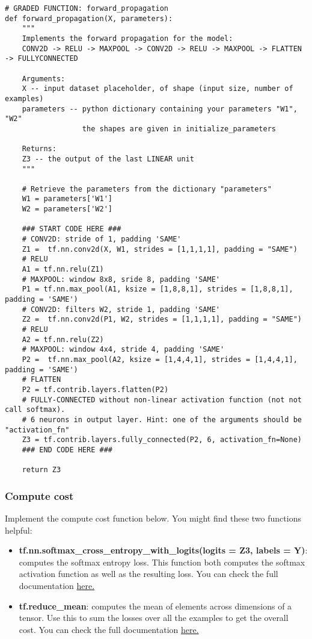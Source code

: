     
\begin{verbatim}
# GRADED FUNCTION: forward_propagation
def forward_propagation(X, parameters):
    """
    Implements the forward propagation for the model:
    CONV2D -> RELU -> MAXPOOL -> CONV2D -> RELU -> MAXPOOL -> FLATTEN -> FULLYCONNECTED
    
    Arguments:
    X -- input dataset placeholder, of shape (input size, number of examples)
    parameters -- python dictionary containing your parameters "W1", "W2"
                  the shapes are given in initialize_parameters

    Returns:
    Z3 -- the output of the last LINEAR unit
    """
    
    # Retrieve the parameters from the dictionary "parameters" 
    W1 = parameters['W1']
    W2 = parameters['W2']
    
    ### START CODE HERE ###
    # CONV2D: stride of 1, padding 'SAME'
    Z1 =  tf.nn.conv2d(X, W1, strides = [1,1,1,1], padding = "SAME")
    # RELU
    A1 = tf.nn.relu(Z1)
    # MAXPOOL: window 8x8, sride 8, padding 'SAME'
    P1 = tf.nn.max_pool(A1, ksize = [1,8,8,1], strides = [1,8,8,1], padding = 'SAME')
    # CONV2D: filters W2, stride 1, padding 'SAME'
    Z2 =  tf.nn.conv2d(P1, W2, strides = [1,1,1,1], padding = "SAME")
    # RELU
    A2 = tf.nn.relu(Z2)
    # MAXPOOL: window 4x4, stride 4, padding 'SAME'
    P2 =  tf.nn.max_pool(A2, ksize = [1,4,4,1], strides = [1,4,4,1], padding = 'SAME')
    # FLATTEN
    P2 = tf.contrib.layers.flatten(P2)
    # FULLY-CONNECTED without non-linear activation function (not not call softmax).
    # 6 neurons in output layer. Hint: one of the arguments should be "activation_fn" 
    Z3 = tf.contrib.layers.fully_connected(P2, 6, activation_fn=None)
    ### END CODE HERE ###

    return Z3
\end{verbatim}


\subsubsection{Compute cost}


Implement the compute cost function below. You might find these two functions helpful: 
\begin{itemize}
\item {\textbf{tf.nn.softmax\_cross\_entropy\_with\_logits(logits = Z3, labels = Y)}}: computes the softmax entropy loss. This function both computes the softmax activation function as well as the resulting loss. You can check the full documentation  \href{https://www.tensorflow.org/api_docs/python/tf/nn/softmax\_cross\_entropy\_with\_logits}{here.}
\item {\textbf{tf.reduce\_mean}}: computes the mean of elements across dimensions of a tensor. Use this to sum the losses over all the examples to get the overall cost. You can check the full documentation \href{https://www.tensorflow.org/api_docs/python/tf/reduce_mean}{here.}
\end{itemize} 



